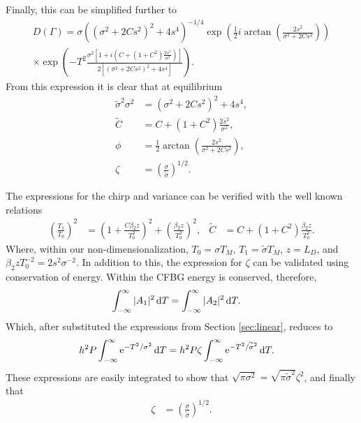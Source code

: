 Finally, this can be simplified further to
\begin{multline*}
D \left( \Gamma \right) = \sigma \left( \left( \sigma^2 + 2C s^2 \right)^2 + 4s^4 \right)^{-1/4} \exp \left( \frac{1}{2} i \arctan \left( \frac{2s^2}{\sigma^2 + 2C s^2} \right) \right) \\
\times \exp \left( -T^2 \frac{\sigma^2 \left[ 1 + i \left( C + (1 + C^2) \frac{2s^2}{\sigma^2} \right) \right]}{2 \left[ (\sigma^2 + 2C s^2)^2 + 4s^4 \right]} \right).
\end{multline*}
From this expression it is clear that at equilibrium
\begin{align*}
\widetilde{\sigma}^2 \sigma^2 &= \left( \sigma^2 + 2 C s^2 \right)^2 + 4s^4, \\
\widetilde{C} &= C + (1+C^2) \frac{2 s^2}{\sigma^2}, \\
\phi &= \frac{1}{2} \arctan \left( \frac{2s^2}{\sigma^2 + 2C s^2} \right), \\
\zeta &= \left( \frac{\sigma}{\widetilde{\sigma}} \right)^{1/2}.
\end{align*}

The expressions for the chirp and variance can be verified with the well known relations \cite{agrawal2013, silfvast, ferreira}
\begin{align*}
\left( \frac{T_1}{T_0} \right)^2 &= \left( 1 + \frac{C \beta_2 z}{T_0^2} \right)^2 + \left( \frac{ \beta_2 z}{T_0^2} \right)^2,&
\widetilde{C} &= C + (1+C^2) \frac{\beta_2 z}{T_0^2}.
\end{align*}
Where, within our non-dimensionalization, $T_0 = \sigma T_M$, $T_1 = \widetilde{\sigma} T_M$, $z = L_D$, and $\beta_2 z T_0^{-2} = 2s^2\sigma^{-2}$. In addition to this, the expression for $\zeta$ can be validated using conservation of energy. Within the CFBG energy is conserved, therefore,
\begin{align*}
\int_{-\infty}^\infty |A_1|^2 \, \textrm{d} T &= \int_{-\infty}^\infty |A_2|^2 \, \textrm{d} T.
\end{align*}
Which, after substituted the expressions from Section \ref{sec:linear}, reduces to
\begin{align*}
h^2 P \int_{-\infty}^\infty \textrm{e}^{-T^2/\sigma^2} \, \textrm{d} T &= h^2 P \zeta \int_{-\infty}^\infty \textrm{e}^{-T^2/\widetilde{\sigma}^2} \, \textrm{d} T.
\end{align*}
These expressions are easily integrated to show that $\sqrt{\pi \sigma^2} = \sqrt{\pi \widetilde{\sigma}^2} \zeta^2$, and finally that
\begin{align*}
\zeta &= \left( \frac{\sigma}{\widetilde{\sigma}} \right)^{1/2}.
\end{align*}






